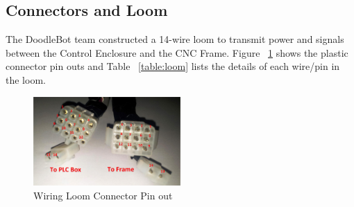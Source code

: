 	\subsection{Connectors and Loom}
	
	The DoodleBot team constructed a 14-wire loom to transmit power and signals between the Control Enclosure and the CNC Frame. Figure ~\ref{fig:loom} shows the plastic connector pin outs and Table ~\ref{table:loom} lists the details of each wire/pin in the loom.
		\begin{figure}[h]
			\centering
			\includegraphics[width=0.5\textwidth]{figures/cncMachine/loom.jpg}
			\caption{Wiring Loom Connector Pin out}
			\label{fig:loom}
		\end{figure}
		
